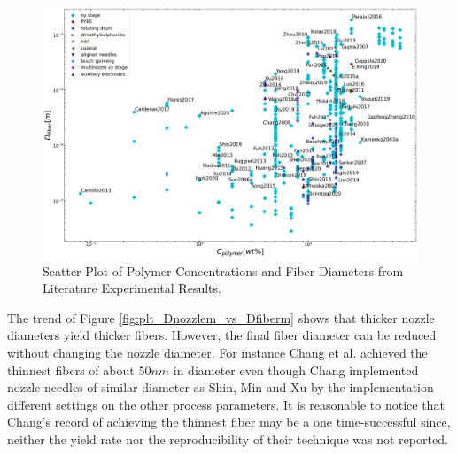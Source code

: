 \begin{figure}[!th]
\centering
\includegraphics[width=\textwidth]{./Figures/plt_Cpolymerwt_vs_Dfiberm.png}
\decoRule
\caption[Scatter Plot of Polymer Concentrations and Fiber Diameters from Literature Experimental Results]{Scatter Plot of Polymer Concentrations and Fiber Diameters from Literature Experimental Results. \cite{
  Yang2019,Fattahi2017,Shin2019,Wang2015,Parajuli2016,Zheng2010,Fuh2011,Dalton2015,
  Ru2014,Xue2014,Wang2017,Xu2014,Liu2013,Pan2014,Canton2014,Chakraborty2009,Gupta2007,
  He2018,Zhou2011,Chen2013,Williams2018,Choi2017,Pan2019,Lei2015,Lim2019,Park2020,
  Fuh2012,Flores2017,Chang2010,Xu2019,Zhang2019,Shin2018,Fuh2015,Nagle2019,Zheng2012,
  Kameoka2003a,Liu2014,E.King2019,Hochleitner2017,Madou2011,Jiang2018,Husain2016,
  ElectrospinTech2015,Brown2011,Kolan2018,Chang2011,Beachley2011,Camillo2013,Kameoka2003,
  Bu2012,Lee2012,Huang2015,Coppola2020,CisquellaSerra2019,Ruggieri2013,Hochleitner2014,
  Zhu2016,Brown2014,Chang2008,Sonntag2020,Kim2018,Deng2020,Han2019,George2020,Sun2006a,
  Pan2015,Shen2016,Strauss2019,Fuh2013,Sarkar2007,You2017,Wang2018a,Zheng2014,Song2015,
  GaofengZheng2010,Liu2015a,Min2013,Luo2016,Yousefi2019,Cardenas2017,Coppola2014}}
\label{fig:plt_Cpolymerwt_vs_Dfiberm}
\end{figure}

The trend of Figure \ref{fig:plt_Dnozzlem_vs_Dfiberm} shows that thicker nozzle diameters yield thicker fibers. However, the final fiber diameter can be reduced without changing the nozzle diameter. For instance Chang et al. \cite{Chang2008} achieved the thinnest fibers of about $50 nm$ in diameter even though Chang implemented nozzle needles of similar diameter as Shin, Min and Xu by the implementation different settings on the other process parameters. \cite{Shin2019, Min2013, Xu2014} It is reasonable to notice that Chang's record of achieving the thinnest fiber may be a one time-successful since, neither the yield rate nor the reproducibility of their technique was not reported.

